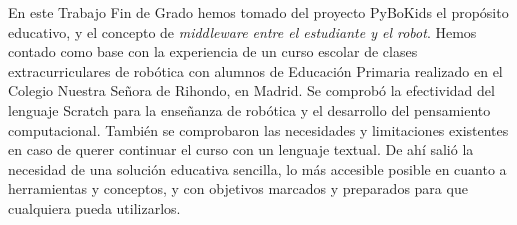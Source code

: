 En este Trabajo Fin de Grado hemos tomado del proyecto PyBoKids el propósito educativo, y el concepto de \textit{middleware entre el estudiante y el robot}. Hemos contado como base con la experiencia de un curso escolar de clases extracurriculares de robótica con alumnos de Educación Primaria realizado en el Colegio Nuestra Señora de Rihondo, en Madrid. Se comprobó la efectividad del lenguaje Scratch para la enseñanza de robótica y el desarrollo del pensamiento computacional. También se comprobaron las necesidades y limitaciones existentes en caso de querer continuar el curso con un lenguaje textual. De ahí salió la necesidad de una solución educativa sencilla, lo más accesible posible en cuanto a herramientas y conceptos, y con objetivos marcados y preparados para que cualquiera pueda utilizarlos.


